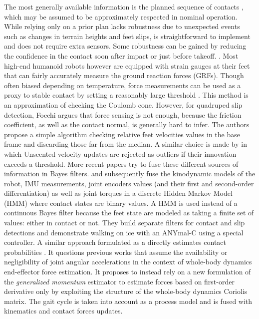 The most generally available information is the planned sequence of contacts \cite{bledt2018contact}, which may be assumed to be approximately respected in nominal operation. 
While relying only on a prior plan lacks robustness due to unexpected events such as changes in terrain heights and feet slips, is straightforward to implement and 
does not require extra sensors. Some robustness can be gained by reducing the confidence in the contact soon after impact or just before takeoff. 
\cite{leziart2021implementation, bledt2018contact}. Most high-end humanoid robots however \cite{stasse2017talos, englsberger2014overview} are 
equipped with strain gauges at their feet that can fairly accurately measure the ground reaction forces (GRFs). 
Though often biased depending on temperature, force measurements can be used as a proxy to stable contact by setting a reasonably large threshold \cite{fallon2014drift}. 
This method is an approximation of checking the Coulomb cone.
However, for quadruped slip detection, Focchi \cite{Focchi2015SlipDA} argues that force sensing is not enough, because the friction coefficient,
as well as the contact normal, is generally hard to infer. The authors propose a simple algorithm checking relative feet velocities values in the base frame and discarding those
far from the median. A similar choice is made by \cite{bloesch2013stateSlippery} in which Unscented \KalmanF velocity updates are rejected as outliers if their innovation exceeds a threshold.  
More recent papers try to fuse these different sources of information in Bayes filters. \cite{hwangbo2016probabilistic} and subsequently \cite{jenelten2019dynamic} fuse 
the kinodynamic models of the robot, IMU measurements, joint encoders values (and their first and second-order differentiation) as well as
joint torques in a discrete Hidden Markov Model (HMM) where contact states are binary values. A HMM is used instead of a continuous Bayes filter because the feet state are modeled as taking a finite set of values: either in contact or not.
They build separate filters for contact and slip detections and demonstrate walking on ice with an 
\mbox{ANYmal-C} using a special controller. A similar approach formulated as a \KalmanF directly estimates contact probabilities \cite{bledt2018contact}. 
It questions previous works that assume the availability  \cite{hwangbo2016probabilistic} or negligibility \cite{camurri2017probabilistic} of joint angular 
accelerations in the context of whole-body dynamics end-effector force estimation.
It proposes to instead rely on a new formulation of the \textit{generalized momentum} estimator to estimate forces based on first-order derivative only by exploiting the 
structure of the whole-body dynamics Coriolis matrix. The gait cycle is taken into account as a process model and is fused with kinematics and contact forces updates.  

